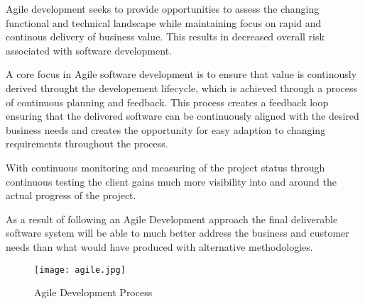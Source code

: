 Agile development seeks to provide opportunities to assess the changing functional and technical landscape while maintaining focus on rapid and continous delivery of business value. This results in decreased overall risk associated with software development.

A core focus in Agile software development is to ensure that value is continously derived throught the developement lifecycle, which is achieved through a process of continuous planning and feedback. This process creates a feedback loop ensuring that the delivered software can be continuously aligned with the desired business needs and creates the opportunity for easy adaption to changing requirements throughout the process.

With continuous monitoring and measuring of the project status through continuous testing the client gains much more visibility into and around the actual progress of the project.

As a result of following an Agile Development approach the final deliverable software system will be able to much better address the business and customer needs than what would have produced with alternative methodologies.

\begin{figure}[t]
  \centering
  \texttt{[image: agile.jpg]}
  \caption{Agile Development Process}
\end{figure}
